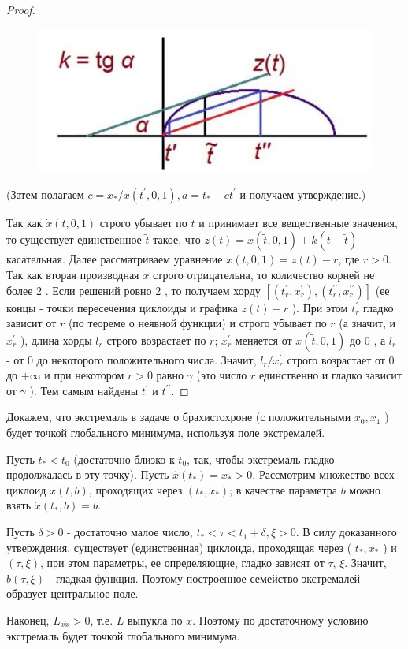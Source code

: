 \begin{task}
\begin{proof}
\begin{figure}[h!]
    \centering
    \includegraphics[width=0.99\linewidth]{tasks/task27/pic1.jpg}
\end{figure}

(Затем полагаем $c=x_{*} / x\left(t^{\prime}, 0,1\right), a=t_{*}-c t^{\prime}$ и получаем утверждение.)

Так как $\dot{x}(t, 0,1)$ строго убывает по $t$ и принимает все вещественные значения, то существует единственное $\tilde{t}$ такое, что $z(t)=x(\tilde{t}, 0,1)+k(t-\tilde{t})$ - касательная. Далее рассматриваем уравнение $x(t, 0,1)=z(t)-r$, где $r>0$. Так как вторая производная $x$ строго отрицательна, то количество корней не более 2 . Если решений ровно 2 , то получаем хорду $\left[\left(t_{r}^{\prime}, x_{r}^{\prime}\right),\left(t_{r}^{\prime \prime}, x_{r}^{\prime \prime}\right)\right]$ (ее концы - точки пересечения циклоиды и графика $z(t)-r$ ). При этом $t_{r}^{\prime}$ гладко зависит от $r$ (по теореме о неявной функции) и строго убывает по $r$ (а значит, и $x_{r}^{\prime}$ ), длина хорды $l_{r}$ строго возрастает по $r$; $x_{r}^{\prime}$ меняется от $x(\tilde{t}, 0,1)$ до 0 , а $l_{r}$ - от 0 до некоторого положительного числа. Значит, $l_{r} / x_{r}^{\prime}$ строго возрастает от 0 до $+\infty$ и при некотором $r>0$ равно $\gamma$ (это число $r$ единственно и гладко зависит от $\gamma$ ). Тем самым найдены $t^{\prime}$ и $t^{\prime \prime} . $
\end{proof}

Докажем, что экстремаль в задаче о брахистохроне (с положительными $x_{0}, x_{1}$ ) будет точкой глобального минимума, используя поле экстремалей.

Пусть $t_{*}<t_{0}$ (достаточно близко к $t_{0}$, так, чтобы экстремаль гладко продолжалась в эту точку). Пусть $\hat{x}\left(t_{*}\right)=x_{*}>0$. Рассмотрим множество всех циклоид $x(t, b)$, проходящих через $\left(t_{*}, x_{*}\right)$; в качестве параметра $b$ можно взять $\dot{x}\left(t_{*}, b\right)=b$.

Пусть $\delta>0$ - достаточно малое число, $t_{*}<\tau<t_{1}+\delta, \xi>0$. В силу доказанного утверждения, существует (единственная) циклоида, проходящая через ( $t_{*}, x_{*}$ ) и $(\tau, \xi)$, при этом параметры, ее определяющие, гладко зависят от $\tau$, $\xi$. Значит, $b(\tau, \xi)$ - гладкая функция. Поэтому построенное семейство экстремалей образует центральное поле.

Наконец, $L_{\dot{x} \dot{x}}>0$, т.е. $L$ выпукла по $\dot{x}$. Поэтому по достаточному условию экстремаль будет точкой глобального минимума.
\end{task}